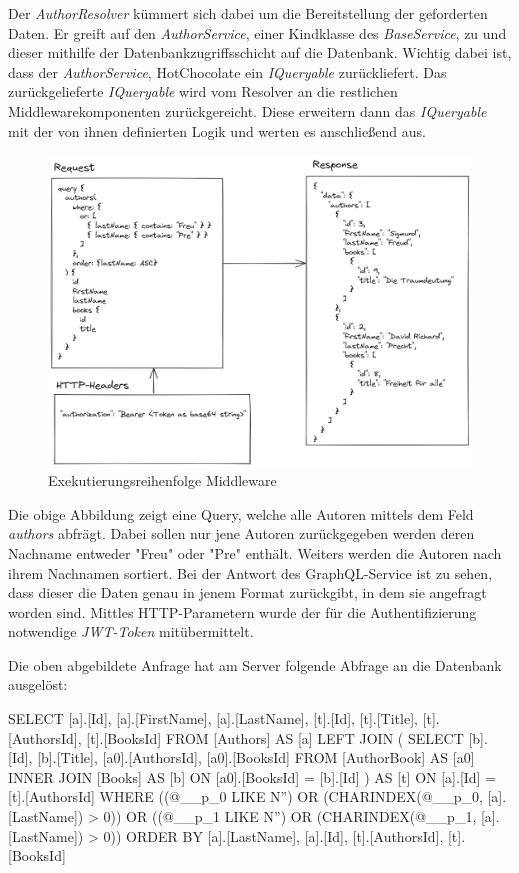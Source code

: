Der \textit{AuthorResolver} kümmert sich dabei um die Bereitstellung der geforderten Daten.
Er greift auf den \textit{AuthorService}, einer Kindklasse des \textit{BaseService}, zu und dieser mithilfe der Datenbankzugriffsschicht auf die Datenbank.
Wichtig dabei ist, dass der \textit{AuthorService}, HotChocolate ein \textit{IQueryable} zurückliefert.
Das zurückgelieferte \textit{IQueryable} wird vom Resolver an die restlichen Middlewarekomponenten zurückgereicht.
Diese erweitern dann das \textit{IQueryable} mit der von ihnen definierten Logik und werten es anschließend aus.

\begin{figure}[H]
    \includegraphics[width=\textwidth]{pics/authors_request.png}
    \caption{Exekutierungsreihenfolge Middleware}
\end{figure}

Die obige Abbildung zeigt eine Query, welche alle Autoren mittels dem Feld \textit{authors} abfrägt.
Dabei sollen nur jene Autoren zurückgegeben werden deren Nachname entweder "Freu" oder "Pre" enthält.
Weiters werden die Autoren nach ihrem Nachnamen sortiert.
Bei der Antwort des GraphQL-Service ist zu sehen, dass dieser die Daten genau in jenem Format zurückgibt, in dem sie angefragt worden sind.
Mittles HTTP-Parametern wurde der für die Authentifizierung notwendige \textit{JWT-Token} mitübermittelt.
\newline

Die oben abgebildete Anfrage hat am Server folgende Abfrage an die Datenbank ausgelöst:
\begin{JsCode}
SELECT [a].[Id], [a].[FirstName], [a].[LastName], [t].[Id], [t].[Title], [t].[AuthorsId], [t].[BooksId]
FROM [Authors] AS [a]
LEFT JOIN (
    SELECT [b].[Id], [b].[Title], [a0].[AuthorsId], [a0].[BooksId]
    FROM [AuthorBook] AS [a0]
    INNER JOIN [Books] AS [b] ON [a0].[BooksId] = [b].[Id]
) AS [t] ON [a].[Id] = [t].[AuthorsId]
WHERE ((@__p_0 LIKE N'') OR (CHARINDEX(@__p_0, [a].[LastName]) > 0)) OR ((@__p_1 LIKE N'') OR (CHARINDEX(@__p_1, [a].[LastName]) > 0))
ORDER BY [a].[LastName], [a].[Id], [t].[AuthorsId], [t].[BooksId]
\end{JsCode}

